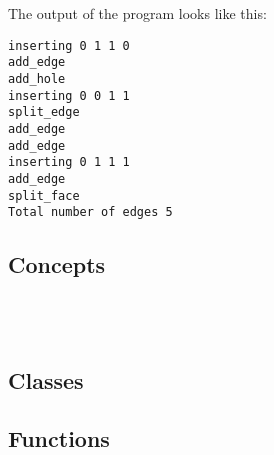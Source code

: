 \begin{ccAdvanced}

The output of the program looks like this:
\begin{verbatim}
inserting 0 1 1 0
add_edge
add_hole
inserting 0 0 1 1
split_edge
add_edge
add_edge
inserting 0 1 1 1
add_edge
split_face
Total number of edges 5
\end{verbatim}

\end{ccAdvanced}



\begin{ccTexOnly}

\subsection*{Concepts}
\\
\\

\subsection*{Classes}


\subsection*{Functions}
\\
\\

\end{ccTexOnly}












